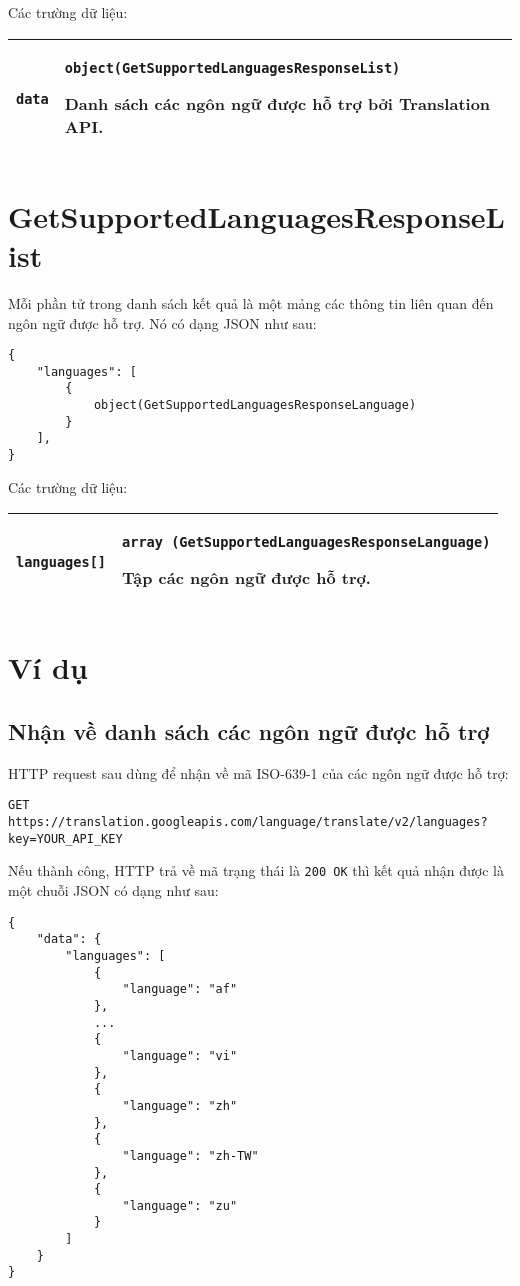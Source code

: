 \documentclass[../thesis.tex]{subfiles}
\begin{document}
Các trường dữ liệu:
\begin{center}
\begin{tabularx}{\textwidth}{|p{}|X|}
\hline
\lstinline{data} & \lstinline{object(GetSupportedLanguagesResponseList)}

Danh sách các ngôn ngữ được hỗ trợ bởi Translation API.\\
\hline
\end{tabularx}
\end{center}

\section{GetSupportedLanguagesResponseList}
Mỗi phần tử trong danh sách kết quả là một mảng các thông tin liên quan đến ngôn ngữ được hỗ trợ. Nó có dạng JSON như sau:

\begin{lstlisting}[style=link]
{
	"languages": [
		{
			object(GetSupportedLanguagesResponseLanguage)
		}
	],
}
\end{lstlisting}

Các trường dữ liệu:
\begin{center}
\begin{tabularx}{\textwidth}{|p{}|X|}
\hline
\lstinline{languages[]} & \lstinline{array (GetSupportedLanguagesResponseLanguage)}

Tập các ngôn ngữ được hỗ trợ.\\
\hline
\end{tabularx}
\end{center}

\section{Ví dụ}
\subsection{Nhận về danh sách các ngôn ngữ được hỗ trợ}
HTTP request sau dùng để nhận về mã ISO-639-1 của các ngôn ngữ được hỗ trợ:
\begin{lstlisting}[style=link]
GET https://translation.googleapis.com/language/translate/v2/languages?key=YOUR_API_KEY
\end{lstlisting}

Nếu thành công, HTTP trả về mã trạng thái là \lstinline{200 OK} thì kết quả nhận được là một chuỗi JSON có dạng như sau:

\begin{lstlisting}[style=link]
{
	"data": {
		"languages": [
			{
				"language": "af"
			},
			...
			{
				"language": "vi"
			},
			{
				"language": "zh"
			},
			{
				"language": "zh-TW"
			},
      		{
				"language": "zu"
			}
		]
	}
}
\end{lstlisting}
\end{document}
